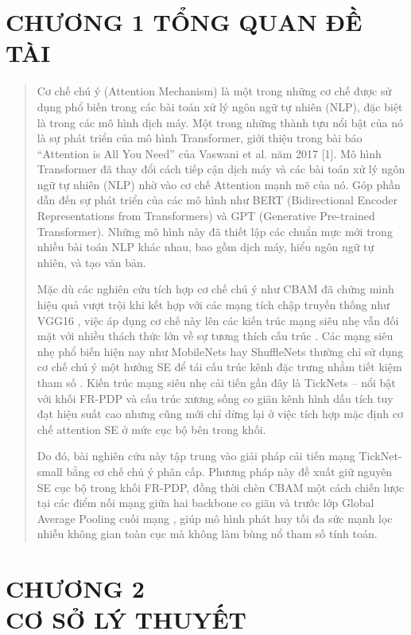 \documentclass[
]{article}
\begin{document}
\hypertarget{chux1b0ux1a1ng-1-tux1ed5ng-quan-ux111ux1ec1-tuxe0i}{%
\section{CHƯƠNG 1 TỔNG QUAN ĐỀ
TÀI}\label{chux1b0ux1a1ng-1-tux1ed5ng-quan-ux111ux1ec1-tuxe0i}}

\begin{quote}
Cơ chế chú ý (Attention Mechanism) là một trong những cơ chế được sử
dụng phổ biến trong các bài toán xử lý ngôn ngữ tự nhiên (NLP), đặc biệt
là trong các mô hình dịch máy. Một trong những thành tựu nổi bật của nó
là sự phát triển của mô hình Transformer, giới thiệu trong bài báo
``Attention is All You Need'' của Vaswani et al. năm 2017 {[}1{]}. Mô
hình Transformer đã thay đổi cách tiếp cận dịch máy và các bài toán xử
lý ngôn ngữ tự nhiên (NLP) nhờ vào cơ chế Attention mạnh mẽ của nó. Góp
phần dẫn đến sự phát triển của các mô hình như BERT (Bidirectional
Encoder Representations from Transformers) và GPT (Generative
Pre-trained Transformer). Những mô hình này đã thiết lập các chuẩn mực
mới trong nhiều bài toán NLP khác nhau, bao gồm dịch máy, hiểu ngôn ngữ
tự nhiên, và tạo văn bản.

Mặc dù các nghiên cứu tích hợp cơ chế chú ý như CBAM đã chứng minh hiệu
quả vượt trội khi kết hợp với các mạng tích chập truyền thống như VGG16
, việc áp dụng cơ chế này lên các kiến trúc mạng siêu nhẹ vẫn đối mặt
với nhiều thách thức lớn về sự tương thích cấu trúc . Các mạng siêu nhẹ
phổ biến hiện nay như MobileNets hay ShuffleNets thường chỉ sử dụng cơ
chế chú ý một hướng SE để tái cấu trúc kênh đặc trưng nhằm tiết kiệm
tham số . Kiến trúc mạng siêu nhẹ cải tiến gần đây là TickNets -- nổi
bật với khối FR-PDP và cấu trúc xương sống co giãn kênh hình dấu tích
tuy đạt hiệu suất cao nhưng cũng mới chỉ dừng lại ở việc tích hợp mặc
định cơ chế attention SE ở mức cục bộ bên trong khối.

Do đó, bài nghiên cứu này tập trung vào giải pháp cải tiến mạng
TickNet-small bằng cơ chế chú ý phân cấp. Phương pháp này đề xuất giữ
nguyên SE cục bộ trong khối FR-PDP, đồng thời chèn CBAM một cách chiến
lược tại các điểm nối mạng giữa hai backbone co giãn và trước lớp Global
Average Pooling cuối mạng , giúp mô hình phát huy tối đa sức mạnh lọc
nhiễu không gian toàn cục mà không làm bùng nổ tham số tính toán.
\end{quote}

\hypertarget{chux1b0ux1a1ng-2-cux1a1-sux1edf-luxfd-thuyux1ebft}{%
\section{\texorpdfstring{CHƯƠNG 2\\
CƠ SỞ LÝ
THUYẾT}{CHƯƠNG 2 CƠ SỞ LÝ THUYẾT}}\label{chux1b0ux1a1ng-2-cux1a1-sux1edf-luxfd-thuyux1ebft}}
\end{document}
